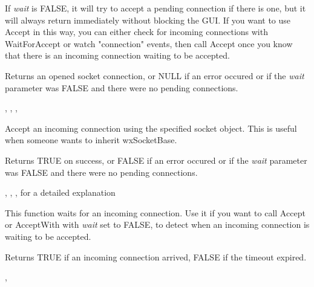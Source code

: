 If {\it wait} is FALSE, it will try to accept a pending connection
if there is one, but it will always return immediately without
blocking the GUI. If you want to use Accept in this way, you can
either check for incoming connections with WaitForAccept or watch
"connection" events, then call Accept once you know that there is
an incoming connection waiting to be accepted.


Returns an opened socket connection, or NULL if an error occured or
if the {\it wait} parameter was FALSE and there were no pending
connections.


, 
, 
, 

%
%
\label{wxsocketserveracceptwith}


Accept an incoming connection using the specified socket object.
This is useful when someone wants to inherit wxSocketBase.




Returns TRUE on success, or FALSE if an error occured or if the
{\it wait} parameter was FALSE and there were no pending
connections.

, 
, 
, 
 for a detailed explanation

%
%
\label{wxsocketserverwaitforaccept}


This function waits for an incoming connection. Use it if you want to call
Accept or AcceptWith with {\it wait} set to FALSE, to detect when an incoming
connection is waiting to be accepted.





Returns TRUE if an incoming connection arrived, FALSE if the timeout expired.


, 

